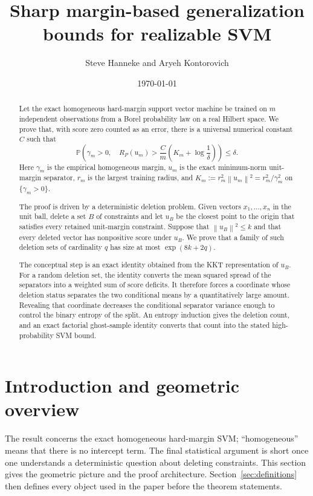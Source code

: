 \documentclass[11pt]{article}
\title{
Sharp margin-based generalization bounds for realizable SVM
}
\author{Steve Hanneke and Aryeh Kontorovich}
\date{\today}
\theoremstyle{definition}
\theoremstyle{remark}
\newcommand{\Pp}{\mathbb P}
\newcommand{\norm}[1]{\left\lVert #1\right\rVert}
\newcommand{\Risk}{R_P}
\begin{document}
\maketitle

\begin{abstract}
Let the exact homogeneous hard-margin support vector machine be trained on
\(m\) independent observations from a Borel probability law on a real Hilbert
space. We prove that, with score zero counted as an error, there is a universal
numerical constant \(C\) such that
\[
 \Pp\left(
   \gamma_m>0,\quad
   \Risk(u_m)>
   \frac{C}{m}
   \left(
      K_m+\log\frac1\delta
   \right)
 \right)
 \le \delta .
\]
Here \(\gamma_m\) is the empirical homogeneous margin, \(u_m\) is the exact
minimum-norm unit-margin separator, \(r_m\) is the largest training radius,
and \(K_m:=r_m^2\norm{u_m}^2=r_m^2/\gamma_m^2\) on
\(\{\gamma_m>0\}\).

The proof is driven by a deterministic deletion problem. Given vectors
\(x_1,\ldots,x_n\) in the unit ball, delete a set \(B\) of constraints and
let \(u_B\) be the closest point to the origin that satisfies every retained
unit-margin constraint. Suppose that \(\norm{u_B}^2\le k\) and that every
deleted vector has nonpositive score under \(u_B\). We prove that a family of
such deletion sets of cardinality \(q\) has size at most
\(\exp(8k+2q)\).

The conceptual step is an exact identity obtained from the KKT
representation of \(u_B\). For a random deletion set, the identity converts
the mean squared spread of the separators into a weighted sum of score
deficits. It therefore forces a coordinate whose deletion status separates
the two conditional means by a quantitatively large amount. Revealing that
coordinate decreases the conditional separator variance enough to control
the binary entropy of the split. An entropy induction gives the deletion
count, and an exact factorial ghost-sample identity converts that count into
the stated high-probability SVM bound.
\end{abstract}

\section{Introduction and geometric overview}
\label{sec:introduction}

The result concerns the exact homogeneous hard-margin SVM; ``homogeneous''
means that there is no intercept term. The final statistical argument is
short once one understands a deterministic question about deleting
constraints. This section gives the geometric picture and the proof
architecture. Section~\ref{sec:definitions} then defines every object used in
the paper before the theorem statements.
\end{document}
